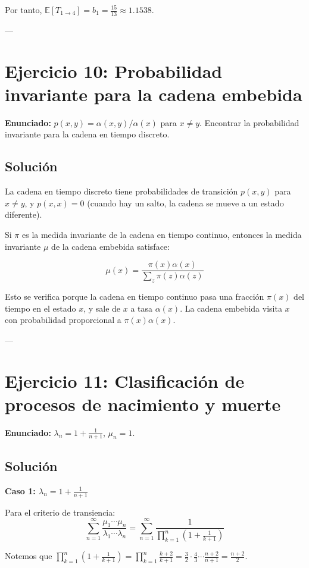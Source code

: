 \documentclass{article}
\theoremstyle{definition}
\newcommand{\E}{\mathbb{E}}
\begin{document}
Por tanto, $\E[T_{1\to4}] = b_1 = \frac{15}{13} \approx 1.1538$.

---

\section*{Ejercicio 10: Probabilidad invariante para la cadena embebida}

\textbf{Enunciado:} $p(x,y) = \alpha(x,y)/\alpha(x)$ para $x \neq y$. Encontrar la probabilidad invariante para la cadena en tiempo discreto.

\subsection*{Solución}

La cadena en tiempo discreto tiene probabilidades de transición $p(x,y)$ para $x \neq y$, y $p(x,x) = 0$ (cuando hay un salto, la cadena se mueve a un estado diferente).

Si $\pi$ es la medida invariante de la cadena en tiempo continuo, entonces la medida invariante $\mu$ de la cadena embebida satisface:

\[
\mu(x) = \frac{\pi(x)\alpha(x)}{\sum_z \pi(z)\alpha(z)}
\]

Esto se verifica porque la cadena en tiempo continuo pasa una fracción $\pi(x)$ del tiempo en el estado $x$, y sale de $x$ a tasa $\alpha(x)$. La cadena embebida visita $x$ con probabilidad proporcional a $\pi(x)\alpha(x)$.

---

\section*{Ejercicio 11: Clasificación de procesos de nacimiento y muerte}

\textbf{Enunciado:} $\lambda_n = 1 + \frac{1}{n+1}$, $\mu_n = 1$.

\subsection*{Solución}

\textbf{Caso 1: $\lambda_n = 1 + \frac{1}{n+1}$}

Para el criterio de transiencia:
\[
\sum_{n=1}^\infty \frac{\mu_1 \cdots \mu_n}{\lambda_1 \cdots \lambda_n} = \sum_{n=1}^\infty \frac{1}{\prod_{k=1}^n \left(1 + \frac{1}{k+1}\right)}
\]

Notemos que $\prod_{k=1}^n \left(1 + \frac{1}{k+1}\right) = \prod_{k=1}^n \frac{k+2}{k+1} = \frac{3}{2} \cdot \frac{4}{3} \cdots \frac{n+2}{n+1} = \frac{n+2}{2}$.
\end{document}
